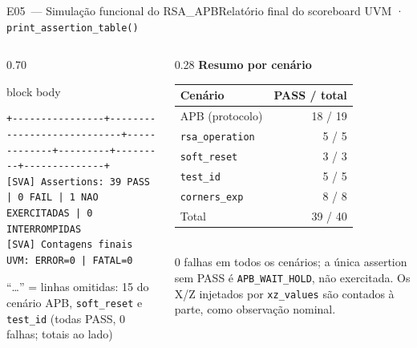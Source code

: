 \documentclass[aspectratio=169,10pt,t]{beamer}
\begin{document}
\begin{frame}[fragile]{E05~— Simulação funcional do RSA\_APB}{Relatório final do scoreboard UVM · \texttt{print\_assertion\_table()}}
\begin{columns}[T]
\begin{column}{0.70\textwidth}
\begin{beamercolorbox}[rounded=true,shadow=false,sep=3pt]{block body}
\begin{verbatim}
+----------------+----------------------------+-------------+---------+---------+--------------+
[SVA] Assertions: 39 PASS | 0 FAIL | 1 NAO EXERCITADAS | 0 INTERROMPIDAS
[SVA] Contagens finais UVM: ERROR=0 | FATAL=0
\end{verbatim}
\vspace*{-0.6\baselineskip}
      \end{beamercolorbox}
      {\tiny ``\dots'' = linhas omitidas: 15 do cenário APB, \texttt{soft\_reset} e \texttt{test\_id} (todas PASS, 0 falhas; totais ao lado)}
    \end{column}
    \begin{column}{0.28\textwidth}
      \scriptsize
      \textbf{\color{tmCafe}Resumo por cenário}\\[0.1cm]
      \begin{tabular}{@{}lr@{}}
        \toprule
        Cenário & PASS / total \\
        \midrule
        APB (protocolo) & 18 / 19 \\
        \texttt{rsa\_operation} & 5 / 5 \\
        \texttt{soft\_reset} & 3 / 3 \\
        \texttt{test\_id} & 5 / 5 \\
        \texttt{corners\_exp} & 8 / 8 \\
        \midrule
        Total & 39 / 40 \\
        \bottomrule
      \end{tabular}\\[0.15cm]
      {\tiny 0 falhas em todos os cenários; a única assertion sem PASS é \texttt{APB\_WAIT\_HOLD}, não exercitada. Os X/Z injetados por \texttt{xz\_values} são contados à parte, como observação nominal.}
    \end{column}
  \end{columns}
\end{frame}

\end{document}
